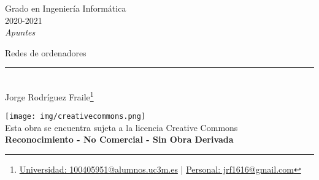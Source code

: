 \documentclass[12pt, twoside, openright]{report} %
\begin{document}

\begin{titlepage}
	\begin{sffamily}
		\color{azulUC3M}
		\begin{center}
			\begin{figure}[H] %
			\end{figure}
			\vspace{2.5cm}
			\begin{Large}
				Grado en Ingeniería Informática\\
				2020-2021\\
				\vspace{2cm}
				\textsl{Apuntes}\\
				\bigskip
			\end{Large}
			{\Huge Redes de ordenadores}\\
			\vspace*{0.5cm}
			\rule{10.5cm}{0.1mm}\\
			\vspace*{0.9cm}
			{\LARGE Jorge Rodríguez Fraile\footnote{\href{mailto:100405951@alumnos.uc3m.es}{Universidad: 100405951@alumnos.uc3m.es}  |  \href{mailto:jrf1616@gmail.com}{Personal: jrf1616@gmail.com}}}\\
			\vspace*{1cm}
		\end{center}
		\vfill
		\color{black}
		\texttt{[image: img/creativecommons.png]}\\
		Esta obra se encuentra sujeta a la licencia Creative Commons\\ \textbf{Reconocimiento - No Comercial - Sin Obra Derivada}
	\end{sffamily}
\end{titlepage}


\tableofcontents
\thispagestyle{fancy}

\listoffigures
\thispagestyle{fancy}


\end{document}
